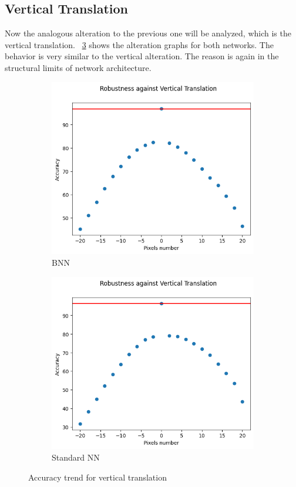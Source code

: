 \subsection{Vertical Translation}

Now the analogous alteration to the previous one will be analyzed, which is the vertical translation. \Fig~\ref{fig:acc_vt_wu} shows the alteration graphs for both networks. The behavior is very similar to the vertical alteration. The reason is again in the structural limits of network architecture.

\begin{figure}[h]
	\centering
	\begin{subfigure}{.5\textwidth}
		\centering
		\includegraphics[width=0.8\linewidth]{ImageFiles/EvalBNN/VT/WU/acc}
		\caption{BNN}
		\label{fig:vt_acc_wu_bnn}
	\end{subfigure}%
	\begin{subfigure}{.5\textwidth}
		\centering
		\includegraphics[width=0.8\linewidth]{ImageFiles/EvalANN/vert_trans_ann}
		\caption{Standard NN}
		\label{fig:vert_trans_ann}
	\end{subfigure}
	\caption{Accuracy trend for vertical translation}
	\label{fig:acc_vt_wu}
\end{figure}


